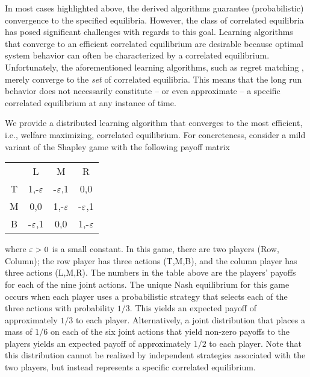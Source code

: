 In most cases highlighted above, the derived algorithms guarantee (probabilistic) convergence to the specified equilibria.  However, the class of correlated equilibria has posed significant challenges with regards to this goal. Learning algorithms that converge to an efficient correlated equilibrium are desirable because optimal system behavior can often be characterized by a correlated equilibrium. Unfortunately, the aforementioned learning algorithms, such as regret matching \cite{Hart2000}, merely converge to the \emph{set} of correlated equilibria. This means that the long run behavior does not necessarily constitute -- or even approximate -- a specific correlated equilibrium at any instance of time.

We provide a distributed learning algorithm that converges to the most efficient, i.e., welfare maximizing, correlated equilibrium.  For concreteness, consider a mild variant of the Shapley game with the following payoff matrix
%
\begin{center}
\begin{tabular}{c|c|c|c|}
\multicolumn{1}{r}{}&
	\multicolumn{1}{c}{{L}}&
		\multicolumn{1}{c}{{M}}&
			\multicolumn{1}{c}{{R}}\\
\cline{2-4}T &1,-$\varepsilon$&-$\varepsilon$,1&0,0\\
\cline{2-4}{M}&0,0&1,-$\varepsilon$&-$\varepsilon$,1\\
\cline{2-4}{B}&-$\varepsilon$,1&0,0&1,-$\varepsilon$\\\cline{2-4}
\end{tabular}
\end{center}
%
where $\varepsilon > 0$ is a small constant.  In this game, there are two players (Row, Column); the row player has three actions (T,M,B), and the column player has three actions (L,M,R). The numbers in the table above are the players' payoffs for each of the nine joint actions.  The unique Nash equilibrium for this game occurs when each player uses a probabilistic strategy that selects each of the three actions with probability $1/3$. This yields an expected payoff of approximately $1/3$ to each player.  Alternatively,  a joint distribution that places a mass of $1/6$ on each of the six joint actions that yield non-zero payoffs to the players yields an expected payoff of approximately $1/2$ to each player. Note that this distribution cannot be realized by independent strategies associated with the two players, but instead represents a specific correlated equilibrium. 


